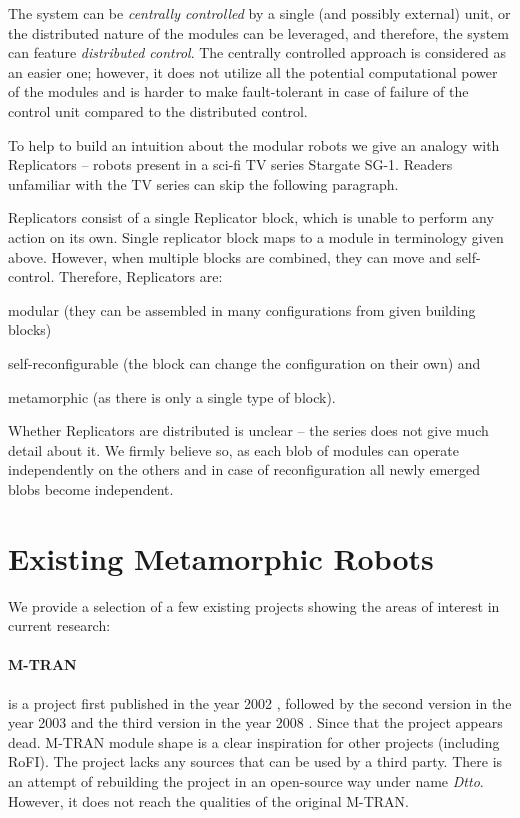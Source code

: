 The system can be \emph{centrally controlled} by a single (and possibly
external) unit, or the distributed nature of the modules can be leveraged, and
therefore, the system can feature \emph{distributed control}. The centrally
controlled approach is considered as an easier one; however, it does not utilize
all the potential computational power of the modules and is harder to make
fault-tolerant in case of failure of the control unit compared to the
distributed control.

To help to build an intuition about the modular robots we give an analogy with
Replicators -- robots present in a sci-fi TV series Stargate
SG-1\cite{wright_stargate_1997}. Readers unfamiliar with the TV series can skip
the following paragraph.

Replicators consist of a single Replicator block, which is unable to perform any
action on its own. Single replicator block maps to a module in terminology given
above. However, when multiple blocks are combined, they can move and
self-control. Therefore, Replicators are:
\begin{enumerate*}
    \item modular (they can be assembled in many configurations from given
    building blocks)
    \item self-reconfigurable (the block can change the configuration on their
    own) and
    \item metamorphic (as there is only a single type of block).
\end{enumerate*}
Whether Replicators are distributed is unclear -- the series does not give much
detail about it. We firmly believe so, as each blob of modules can operate
independently on the others and in case of reconfiguration all newly emerged
blobs become independent.

\section{Existing Metamorphic Robots}

We provide a selection of a few existing projects showing the areas of interest
in current research:

\paragraph{M-TRAN} is a project first published in the year 2002
\cite{murata_m-tran:_2002}, followed by the second version in the year 2003
\cite{haruhisa_kurokawa_m-tran_2003} and the third version in the year 2008
\cite{kurokawa_distributed_2008}. Since that the project appears dead. M-TRAN
module shape is a clear inspiration for other projects (including RoFI). The
project lacks any sources that can be used by a third party. There is an
attempt of rebuilding the project in an open-source way under name
\emph{Dtto}\cite{noauthor_dtto_nodate}. However, it does not reach the qualities
of the original M-TRAN.

